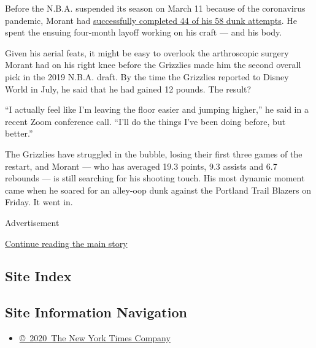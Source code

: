 Before the N.B.A. suspended its season on March 11 because of the
coronavirus pandemic, Morant had
\href{https://stats.nba.com/player/1629630/shooting/}{successfully
completed 44 of his 58 dunk attempts}. He spent the ensuing four-month
layoff working on his craft --- and his body.

Given his aerial feats, it might be easy to overlook the arthroscopic
surgery Morant had on his right knee before the Grizzlies made him the
second overall pick in the 2019 N.B.A. draft. By the time the Grizzlies
reported to Disney World in July, he said that he had gained 12 pounds.
The result?

``I actually feel like I'm leaving the floor easier and jumping
higher,'' he said in a recent Zoom conference call. ``I'll do the things
I've been doing before, but better.''

The Grizzlies have struggled in the bubble, losing their first three
games of the restart, and Morant --- who has averaged 19.3 points, 9.3
assists and 6.7 rebounds --- is still searching for his shooting touch.
His most dynamic moment came when he soared for an alley-oop dunk
against the Portland Trail Blazers on Friday. It went in.

Advertisement

\protect\hyperlink{after-bottom}{Continue reading the main story}

\hypertarget{site-index}{%
\subsection{Site Index}\label{site-index}}

\hypertarget{site-information-navigation}{%
\subsection{Site Information
Navigation}\label{site-information-navigation}}

\begin{itemize}
\tightlist
\item
  \href{https://help.nytimes3xbfgragh.onion/hc/en-us/articles/115014792127-Copyright-notice}{©~2020~The
  New York Times Company}
\end{itemize}

